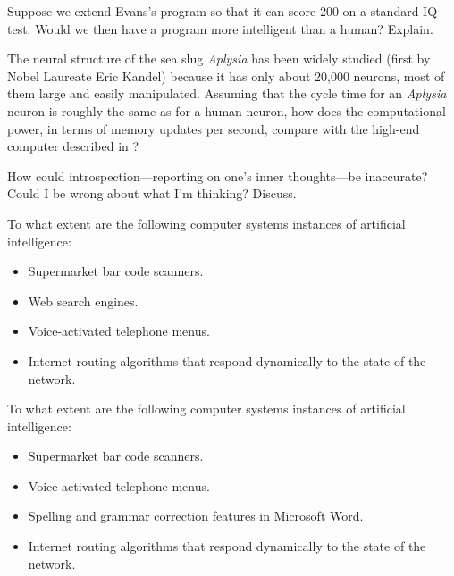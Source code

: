 \begin{uexercise}
Suppose we extend Evans's 
program so that it can score 200 on a standard 
IQ test. Would we then have a program more
intelligent than a human?
Explain.
\end{uexercise} 

\begin{exercise}
The neural structure of the sea slug {\em Aplysia\/} has been widely studied 
(first by Nobel Laureate Eric Kandel) because it has only about 20,000
neurons, most of them large and easily manipulated.  
Assuming that the cycle
time for an {\em Aplysia\/} neuron is roughly the same as for a human neuron, how
does the computational power, in terms of memory updates per second, 
compare with the high-end computer described in ?
\end{exercise} 

\begin{exercise}
    How could introspection---reporting on one's inner thoughts---be 
    inaccurate?   Could I be wrong about what I'm thinking?  Discuss.
\end{exercise} 

\begin{uexercise}
To what extent are the following computer systems instances of artificial
intelligence:
\begin{itemize}
\item Supermarket bar code scanners.
\item Web search engines.
\item Voice-activated telephone menus.
\item Internet routing algorithms that respond dynamically to the state
of the network.
\end{itemize}
\end{uexercise} 

\begin{iexercise}
To what extent are the following computer systems instances of artificial
intelligence:
\begin{itemize}
\item Supermarket bar code scanners.
\item Voice-activated telephone menus.
\item Spelling and grammar correction features in Microsoft Word.
\item Internet routing algorithms that respond dynamically to the state
of the network.
\end{itemize}
\end{iexercise} 

